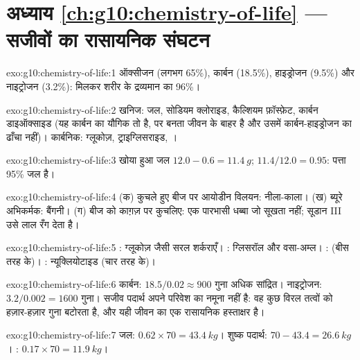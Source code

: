 \section*{अध्याय \ref{ch:g10:chemistry-of-life} --- सजीवों का रासायनिक संघटन}

\begin{solution}{exo:g10:chemistry-of-life:1}
ऑक्सीजन (लगभग 65\%), कार्बन (18.5\%), हाइड्रोजन (9.5\%) और नाइट्रोजन
(3.2\%): मिलकर शरीर के द्रव्यमान का 96\%।
\end{solution}

\begin{solution}{exo:g10:chemistry-of-life:2}
खनिज: जल, सोडियम क्लोराइड, कैल्शियम फ़ॉस्फ़ेट, कार्बन डाइऑक्साइड (यह
कार्बन का यौगिक तो है, पर बनता जीवन के बाहर है और उसमें कार्बन-हाइड्रोजन
का ढाँचा नहीं)। कार्बनिक: ग्लूकोज़, ट्राइग्लिसराइड, ।
\end{solution}

\begin{solution}{exo:g10:chemistry-of-life:3}
खोया हुआ जल $12.0 - 0.6 = \qty{11.4}{g}$; $11.4/12.0 = 0.95$: पत्ता
95\% जल है।
\end{solution}

\begin{solution}{exo:g10:chemistry-of-life:4}
(क) कुचले हुए बीज पर आयोडीन विलयन: नीला-काला। (ख) ब्यूरे अभिकर्मक:
बैंगनी। (ग) बीज को काग़ज़ पर कुचलिए: एक पारभासी धब्बा जो सूखता नहीं;
सूडान III उसे लाल रँग देता है।
\end{solution}

\begin{solution}{exo:g10:chemistry-of-life:5}
: ग्लूकोज़ जैसी सरल शर्कराएँ। : ग्लिसरॉल और
वसा-अम्ल। :  (बीस तरह के)। :
न्यूक्लियोटाइड (चार तरह के)।
\end{solution}

\begin{solution}{exo:g10:chemistry-of-life:6}
कार्बन: $18.5/0.02 \approx 900$ गुना अधिक सांद्रित। नाइट्रोजन:
$3.2/0.002 = 1600$ गुना। सजीव पदार्थ अपने परिवेश का नमूना नहीं है: वह
कुछ विरल तत्वों को हज़ार-हज़ार गुना बटोरता है, और यही जीवन का एक
रासायनिक हस्ताक्षर है।
\end{solution}

\begin{solution}{exo:g10:chemistry-of-life:7}
जल: $0.62 \times 70 = \qty{43.4}{kg}$। शुष्क पदार्थ: $70 - 43.4 =
\qty{26.6}{kg}$। : $0.17 \times 70 = \qty{11.9}{kg}$।
\end{solution}

